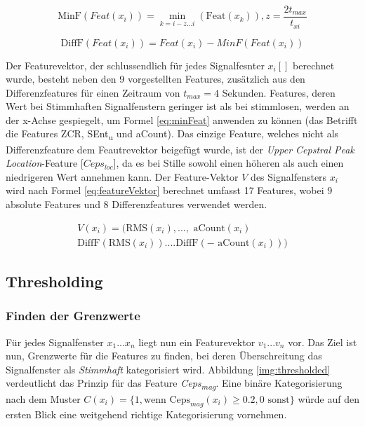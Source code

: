 \begin{equation}
\text{MinF}(Feat(x_i)) = \min_{k=i-z...i}( \text{Feat}(x_k)), z = \frac{2 t_{max}}{t_{xi}}
\label{eq:minFeat}
\end{equation}

\begin{equation}
\text{DiffF}(Feat(x_i)) = Feat(x_i) - MinF(Feat(x_i))
\label{eq:difFeature}
\end{equation}

Der Featurevektor, der schlussendlich für jedes Signalfesnter $x_i[]$ berechnet wurde, besteht neben den 9 vorgestellten Features, zusätzlich aus den Differenzfeatures für einen Zeitraum von $t_{max} = 4$ Sekunden. Features, deren Wert bei Stimmhaften Signalfenstern geringer ist als bei stimmlosen, werden an der x-Achse gespiegelt, um Formel \ref{eq:minFeat} anwenden zu können (das Betrifft die Features ZCR, SEnt\textsubscript{u} und aCount). Das einzige Feature, welches nicht als Differenzfeature dem Feautrevektor beigefügt wurde, ist der \emph{Upper Cepstral Peak Location}-Feature [$Ceps_{loc}$], da es bei Stille sowohl einen höheren als auch einen niedrigeren Wert annehmen kann. Der Feature-Vektor $V$ des Signalfensters $x_i$ wird nach Formel \ref{eq:featureVektor} berechnet umfasst 17 Features, wobei 9 absolute Features und 8 Differenzfeatures verwendet werden.

\begin{equation}
\begin{split}
V(x_i) = \Big( \text{RMS}(x_i), ...,\text{ aCount}(x_i)\\
\text{DiffF}(\text{RMS}(x_i)) .... \text{DiffF}(-\text{ aCount}(x_i))\Big)
\end{split}
\label{eq:featureVektor}
\end{equation}

\subsection{Thresholding}

\subsubsection{Finden der Grenzwerte}

Für jedes Signalfenster $x_1...x_n$ liegt nun ein Featurevektor $v_1...v_n$ vor. Das Ziel ist nun, Grenzwerte für die Features zu finden, bei deren Überschreitung das Signalfenster als \emph{Stimmhaft} kategorisiert wird. Abbildung \ref{img:thresholded} verdeutlicht das Prinzip für das Feature \emph{Ceps\textsubscript{mag}}. Eine binäre Kategorisierung nach dem Muster $C(x_i) = \{ 1, \text{wenn} \text{ Ceps}_{mag}(x_i) \geq 0.2 , 0 \text{ sonst}\}$ würde auf den ersten Blick eine weitgehend richtige Kategorisierung vornehmen.

